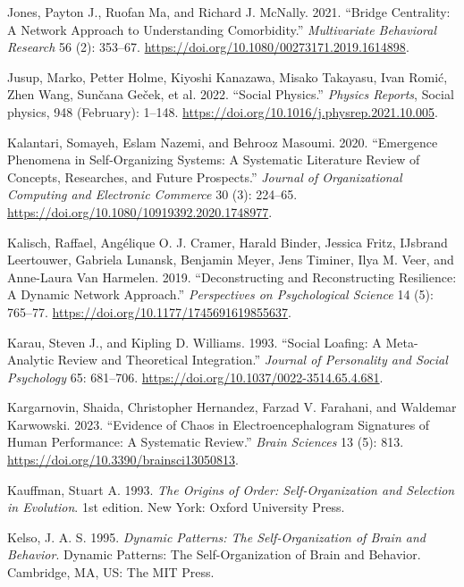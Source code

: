 \documentclass[
  a4paper,
  DIV=11,
  numbers=noendperiod,
  oneside]{scrreprt}
\newlength{\cslhangindent}
\newenvironment{CSLReferences}[2] %
 {\begin{list}{}{%
  \setlength{\itemindent}{0pt}
  \setlength{\leftmargin}{0pt}
  \setlength{\parsep}{0pt}
  \ifodd #1
   \setlength{\leftmargin}{\cslhangindent}
   \setlength{\itemindent}{-1\cslhangindent}
  \fi
  \setlength{\itemsep}{#2\baselineskip}}}
 {\end{list}}
\begin{document}
\begin{CSLReferences}{1}{0}
Jones, Payton J., Ruofan Ma, and Richard J. McNally. 2021. {``Bridge
{Centrality}: {A Network Approach} to {Understanding Comorbidity}.''}
\emph{Multivariate Behavioral Research} 56 (2): 353--67.
\url{https://doi.org/10.1080/00273171.2019.1614898}.

Jusup, Marko, Petter Holme, Kiyoshi Kanazawa, Misako Takayasu, Ivan
Romić, Zhen Wang, Sunčana Geček, et al. 2022. {``Social Physics.''}
\emph{Physics Reports}, Social physics, 948 (February): 1--148.
\url{https://doi.org/10.1016/j.physrep.2021.10.005}.

Kalantari, Somayeh, Eslam Nazemi, and Behrooz Masoumi. 2020.
{``Emergence Phenomena in Self-Organizing Systems: A Systematic
Literature Review of Concepts, Researches, and Future Prospects.''}
\emph{Journal of Organizational Computing and Electronic Commerce} 30
(3): 224--65. \url{https://doi.org/10.1080/10919392.2020.1748977}.

Kalisch, Raffael, Angélique O. J. Cramer, Harald Binder, Jessica Fritz,
IJsbrand Leertouwer, Gabriela Lunansk, Benjamin Meyer, Jens Timiner,
Ilya M. Veer, and Anne-Laura Van Harmelen. 2019. {``Deconstructing and
Reconstructing Resilience: A Dynamic Network Approach.''}
\emph{Perspectives on Psychological Science} 14 (5): 765--77.
\url{https://doi.org/10.1177/1745691619855637}.

Karau, Steven J., and Kipling D. Williams. 1993. {``Social Loafing: {A}
Meta-Analytic Review and Theoretical Integration.''} \emph{Journal of
Personality and Social Psychology} 65: 681--706.
\url{https://doi.org/10.1037/0022-3514.65.4.681}.

Kargarnovin, Shaida, Christopher Hernandez, Farzad V. Farahani, and
Waldemar Karwowski. 2023. {``Evidence of Chaos in Electroencephalogram
Signatures of Human Performance: A Systematic Review.''} \emph{Brain
Sciences} 13 (5): 813. \url{https://doi.org/10.3390/brainsci13050813}.

Kauffman, Stuart A. 1993. \emph{The {Origins} of {Order}:
{Self-Organization} and {Selection} in {Evolution}}. 1st edition. {New
York}: {Oxford University Press}.

Kelso, J. A. S. 1995. \emph{Dynamic Patterns: {The} Self-Organization of
Brain and Behavior}. Dynamic Patterns: {The} Self-Organization of Brain
and Behavior. {Cambridge, MA, US}: {The MIT Press}.


\end{CSLReferences}
\end{document}
